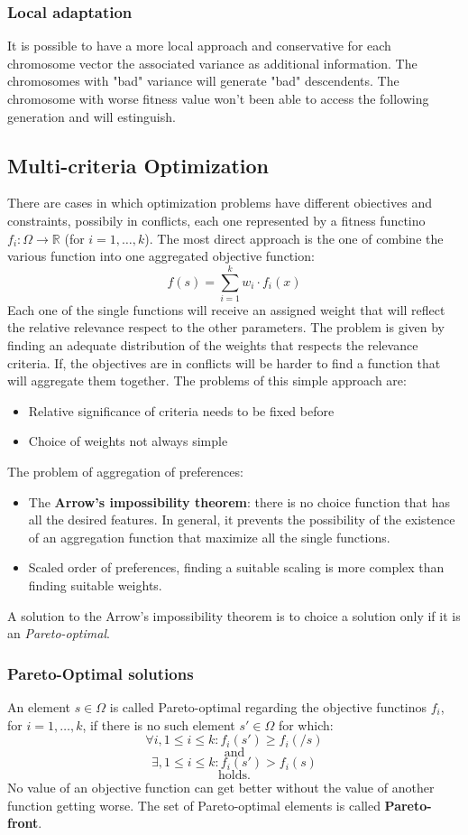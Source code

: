 \documentclass{article}
\begin{document}
\subsubsection{Local adaptation}
It is possible to have a more local approach and conservative for each
chromosome vector the associated variance as additional information.
The chromosomes with "bad" variance will generate "bad" descendents. The chromosome with worse fitness
value won't been able to access the following generation and will estinguish.

\subsection{Multi-criteria Optimization}
There are cases in which optimization problems have different obiectives and constraints, possibily
in conflicts, each one represented by a fitness functino $f_i:\Omega\rightarrow\mathbb{R}$ (for $i=1,\dots,k$).
The most direct approach is the one of combine the various function into one aggregated objective function:
$$f(s)=\sum_{i=1}^k w_i\cdot f_i(x)$$
Each one of the single functions will receive an assigned weight that will reflect the relative
relevance respect to the other parameters. The problem is given by finding an adequate distribution
of the weights that respects the relevance criteria. If, the objectives are in conflicts will
be harder to find a function that will aggregate them together.
The problems of this simple approach are:
\begin{itemize}
    \item Relative significance of criteria needs to be fixed before
    \item Choice of weights not always simple
\end{itemize}
The problem of aggregation of preferences:
\begin{itemize}
    \item The \textbf{Arrow's impossibility theorem}: there is no choice function that has all the
    desired features. In general, it prevents the possibility of the existence of an aggregation
    function that maximize all the single functions.
    \item Scaled order of preferences, finding a suitable scaling is more complex than
    finding suitable weights.
\end{itemize}
A solution to the Arrow's impossibility theorem is to choice a solution only if it is an
\textit{Pareto-optimal}.

\subsubsection{Pareto-Optimal solutions}
An element $s\in\Omega$ is called Pareto-optimal regarding the objective functinos $f_i$,
for $i=1,\dots,k$, if there is no such element $s'\in\Omega$ for which:
$$ \forall i,1\leq i\leq k: f_i(s')\geq f_i(/s)$$
$$\text{and}$$
$$\exists, 1\leq i\leq k: f_i(s')>f_i(s)$$
$$\text{holds.}$$
No value of an objective function can get better without the value of another function
getting worse. The set of Pareto-optimal elements is called \textbf{Pareto-front}.
\end{document}
